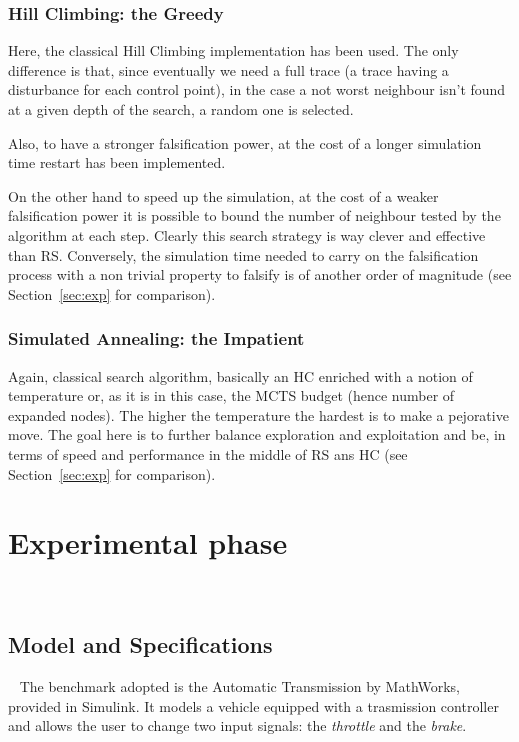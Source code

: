 \documentclass[11pt]{article}
\begin{document}
\subsubsection{Hill Climbing: the Greedy}
Here, the classical Hill Climbing implementation has been used. The only difference is that, since eventually we need a full trace (a trace having a disturbance for each control point), in the case a not worst neighbour isn't found at a given depth of the search, a random one is selected. 

Also, to have a stronger falsification power, at the cost of a longer simulation time restart has been implemented. 

On the other hand to speed up the simulation, at the cost of a weaker falsification power it is possible to bound the number of
neighbour tested by the algorithm at each step. 
Clearly this search strategy is way clever and effective than RS. Conversely, the simulation time needed to carry on the falsification process with a non trivial property to falsify is of another order of magnitude (see Section~\ref{sec:exp} for comparison).

\subsubsection{Simulated Annealing: the Impatient}
Again, classical search algorithm, basically an HC enriched with a notion of temperature or, as it is in this case, the MCTS budget (hence number of expanded nodes). The higher the temperature the hardest is to make a pejorative move. 
The goal here is to further balance exploration and exploitation and be, in terms of speed and performance in the middle of RS ans HC (see Section~\ref{sec:exp} for comparison).


\pagebreak

\section{Experimental phase}~\label{sec:exp}

\subsection{Model and Specifications}~\label{sec:exp:spec}
The benchmark adopted is the Automatic Transmission by MathWorks, provided in Simulink.
It models a vehicle equipped with a trasmission controller and allows the user to change two input signals:
the \textit{throttle} and the \textit{brake}.
\end{document}
